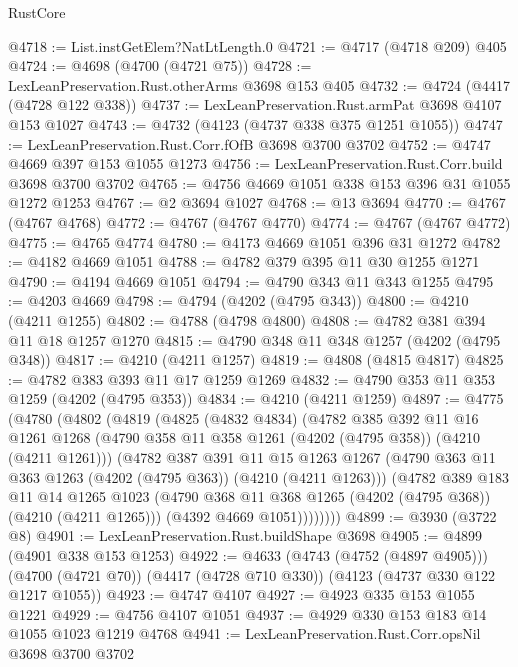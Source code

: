 \begin{lexlean}{RustCore}
\begin{coremodule}
@4718 := List.instGetElem?NatLtLength.{0}
@4721 := @4717 (@4718 @209) @405
@4724 := @4698 (@4700 (@4721 @75))
@4728 := LexLeanPreservation.Rust.otherArms @3698 @153 @405
@4732 := @4724 (@4417 (@4728 @122 @338))
@4737 := LexLeanPreservation.Rust.armPat @3698 @4107 @153 @1027
@4743 := @4732 (@4123 (@4737 @338 @375 @1251 @1055))
@4747 := LexLeanPreservation.Rust.Corr.fOfB @3698 @3700 @3702
@4752 := @4747 @4669 @397 @153 @1055 @1273
@4756 := LexLeanPreservation.Rust.Corr.build @3698 @3700 @3702
@4765 := @4756 @4669 @1051 @338 @153 @396 @31 @1055 @1272 @1253
@4767 := @2 @3694 @1027
@4768 := @13 @3694
@4770 := @4767 (@4767 @4768)
@4772 := @4767 (@4767 @4770)
@4774 := @4767 (@4767 @4772)
@4775 := @4765 @4774
@4780 := @4173 @4669 @1051 @396 @31 @1272
@4782 := @4182 @4669 @1051
@4788 := @4782 @379 @395 @11 @30 @1255 @1271
@4790 := @4194 @4669 @1051
@4794 := @4790 @343 @11 @343 @1255
@4795 := @4203 @4669
@4798 := @4794 (@4202 (@4795 @343))
@4800 := @4210 (@4211 @1255)
@4802 := @4788 (@4798 @4800)
@4808 := @4782 @381 @394 @11 @18 @1257 @1270
@4815 := @4790 @348 @11 @348 @1257 (@4202 (@4795 @348))
@4817 := @4210 (@4211 @1257)
@4819 := @4808 (@4815 @4817)
@4825 := @4782 @383 @393 @11 @17 @1259 @1269
@4832 := @4790 @353 @11 @353 @1259 (@4202 (@4795 @353))
@4834 := @4210 (@4211 @1259)
@4897 := @4775
    (@4780
      (@4802
        (@4819
          (@4825
            (@4832 @4834)
            (@4782
              @385
              @392
              @11
              @16
              @1261
              @1268
              (@4790 @358 @11 @358 @1261 (@4202 (@4795 @358)) (@4210 (@4211 @1261)))
              (@4782
                @387
                @391
                @11
                @15
                @1263
                @1267
                (@4790 @363 @11 @363 @1263 (@4202 (@4795 @363)) (@4210 (@4211 @1263)))
                (@4782
                  @389
                  @183
                  @11
                  @14
                  @1265
                  @1023
                  (@4790 @368 @11 @368 @1265 (@4202 (@4795 @368)) (@4210 (@4211 @1265)))
                  (@4392 @4669 @1051))))))))
@4899 := @3930 (@3722 @8)
@4901 := LexLeanPreservation.Rust.buildShape @3698
@4905 := @4899 (@4901 @338 @153 @1253)
@4922 := @4633
    (@4743 (@4752 (@4897 @4905)))
    (@4700 (@4721 @70))
    (@4417 (@4728 @710 @330))
    (@4123 (@4737 @330 @122 @1217 @1055))
@4923 := @4747 @4107
@4927 := @4923 @335 @153 @1055 @1221
@4929 := @4756 @4107 @1051
@4937 := @4929 @330 @153 @183 @14 @1055 @1023 @1219 @4768
@4941 := LexLeanPreservation.Rust.Corr.opsNil @3698 @3700 @3702

\end{coremodule}
\end{lexlean}
